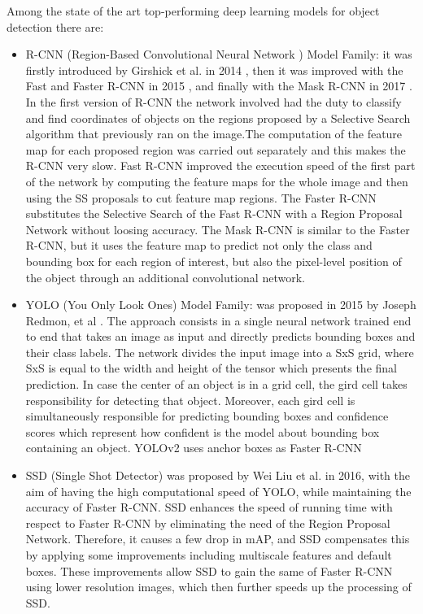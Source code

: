 \documentclass[a4paper,10pt]{report}
\begin{document}
Among the state of the art top-performing deep learning models for object detection there are:
\begin{itemize}
\item R-CNN (Region-Based Convolutional Neural Network ) Model Family: it was firstly introduced by Girshick et al. in 2014 \cite{rcnn}, then it was improved with the Fast \cite{fast-rcnn} and Faster R-CNN in 2015 \cite{faster-rcnn}, and finally with the Mask R-CNN in 2017 \cite{mask-rcnn}.
In the first version of R-CNN the network involved had the duty to classify and find coordinates of objects on the regions proposed by a Selective Search algorithm that previously ran on the image.The computation of the feature map for each proposed region was carried out separately and this makes the R-CNN very slow. Fast R-CNN improved the execution speed of the first part of the network by computing the feature maps for the whole image and then using the SS proposals to cut feature map regions. The Faster R-CNN \cite{faster-rcnn} substitutes the Selective 
Search of the Fast R-CNN with a Region Proposal Network without loosing accuracy. The Mask R-CNN is similar to the Faster R-CNN, but it uses the feature map to predict not only the class and bounding box for each region of interest, but also the pixel-level position of the object through an additional convolutional network. 
\item YOLO (You Only Look Ones) Model Family: was proposed in 2015 by Joseph Redmon, et al \cite{yolo}. The approach consists in a single neural network trained end to end that takes an image as input and directly predicts bounding boxes and their class labels. The network divides the input image into a SxS grid, where SxS is equal to the width and height of the tensor which presents the final prediction. In case the center of an object is in a grid cell, the gird cell takes responsibility for detecting that object. Moreover, each gird cell is simultaneously responsible for predicting bounding boxes and confidence scores which represent how confident is the model about bounding box containing an object. YOLOv2 uses anchor boxes as Faster R-CNN
\item SSD (Single Shot Detector) was proposed by Wei Liu et al. \cite{ssd} in 2016, with the aim of having the high computational speed of YOLO, while maintaining the accuracy of Faster R-CNN. SSD enhances the speed of running time with respect to Faster R-CNN by eliminating the need of the Region Proposal Network. Therefore, it causes a few drop in mAP, and SSD compensates this by applying some improvements including multiscale features and default boxes. These improvements allow SSD to gain the same of Faster R-CNN using lower resolution images, which then further speeds up the processing of SSD.
\end{itemize}
\end{document}
